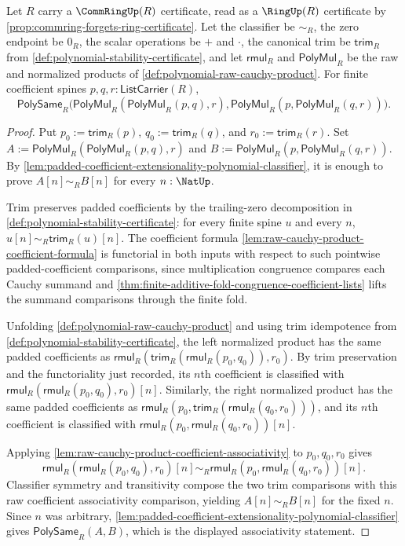 \begin{theorem}
\label{thm:polynomial-multiplication-associativity-commring-scalars}
Let $R$ carry a $\CommRingUp(R)$ certificate, read as a $\RingUp(R)$ certificate by \autoref{prop:commring-forgets-ring-certificate}. Let the classifier be $\sim_R$, the zero endpoint be $0_R$, the scalar operations be $+$ and $\cdot$, the canonical trim be $\mathsf{trim}_R$ from \autoref{def:polynomial-stability-certificate}, and let $\mathsf{rmul}_R$ and $\mathsf{PolyMul}_R$ be the raw and normalized products of \autoref{def:polynomial-raw-cauchy-product}. For finite coefficient spines $p,q,r:\mathsf{ListCarrier}(R)$,
$$
\mathsf{PolySame}_R\bigl(\mathsf{PolyMul}_R(\mathsf{PolyMul}_R(p,q),r),\mathsf{PolyMul}_R(p,\mathsf{PolyMul}_R(q,r))\bigr).
$$
\end{theorem}
\begin{proof}
Put $p_0:=\mathsf{trim}_R(p)$, $q_0:=\mathsf{trim}_R(q)$, and $r_0:=\mathsf{trim}_R(r)$. Set $A:=\mathsf{PolyMul}_R(\mathsf{PolyMul}_R(p,q),r)$ and $B:=\mathsf{PolyMul}_R(p,\mathsf{PolyMul}_R(q,r))$. By \autoref{lem:padded-coefficient-extensionality-polynomial-classifier}, it is enough to prove $A[n]\sim_RB[n]$ for every $n:\NatUp$.

Trim preserves padded coefficients by the trailing-zero decomposition in \autoref{def:polynomial-stability-certificate}: for every finite spine $u$ and every $n$, $u[n]\sim_R\mathsf{trim}_R(u)[n]$. The coefficient formula \autoref{lem:raw-cauchy-product-coefficient-formula} is functorial in both inputs with respect to such pointwise padded-coefficient comparisons, since multiplication congruence compares each Cauchy summand and \autoref{thm:finite-additive-fold-congruence-coefficient-lists} lifts the summand comparisons through the finite fold.

Unfolding \autoref{def:polynomial-raw-cauchy-product} and using trim idempotence from \autoref{def:polynomial-stability-certificate}, the left normalized product has the same padded coefficients as $\mathsf{rmul}_R(\mathsf{trim}_R(\mathsf{rmul}_R(p_0,q_0)),r_0)$. By trim preservation and the functoriality just recorded, its $n$th coefficient is classified with $\mathsf{rmul}_R(\mathsf{rmul}_R(p_0,q_0),r_0)[n]$. Similarly, the right normalized product has the same padded coefficients as $\mathsf{rmul}_R(p_0,\mathsf{trim}_R(\mathsf{rmul}_R(q_0,r_0)))$, and its $n$th coefficient is classified with $\mathsf{rmul}_R(p_0,\mathsf{rmul}_R(q_0,r_0))[n]$.

Applying \autoref{lem:raw-cauchy-product-coefficient-associativity} to $p_0,q_0,r_0$ gives
$$
\mathsf{rmul}_R(\mathsf{rmul}_R(p_0,q_0),r_0)[n]\sim_R\mathsf{rmul}_R(p_0,\mathsf{rmul}_R(q_0,r_0))[n].
$$
Classifier symmetry and transitivity compose the two trim comparisons with this raw coefficient associativity comparison, yielding $A[n]\sim_RB[n]$ for the fixed $n$. Since $n$ was arbitrary, \autoref{lem:padded-coefficient-extensionality-polynomial-classifier} gives $\mathsf{PolySame}_R(A,B)$, which is the displayed associativity statement.
\end{proof}

